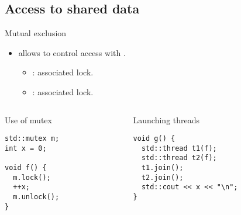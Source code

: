 \subsection{Access to shared data}

\begin{frame}[t,fragile]{Mutual exclusion}
\begin{itemize}
  \item {} allows to control access with .
    \begin{itemize}
      \item {}:  associated lock.
      \item {}:  associated lock.
    \end{itemize}
\end{itemize}

\begin{columns}[T]
\begin{column}{.5\textwidth}
\begin{block}{Use of mutex}
\begin{lstlisting}
std::mutex m;
int x = 0;

void f() {
  m.lock();
  ++x;
  m.unlock();
}

\end{lstlisting}
\end{block}
\end{column}

\begin{column}{.5\textwidth}
\begin{block}{Launching threads}
\begin{lstlisting}
void g() {
  std::thread t1(f); 
  std::thread t2(f);
  t1.join(); 
  t2.join();
  std::cout << x << "\n";
}
\end{lstlisting}
\end{block}
\end{column}
\end{columns}
\end{frame}

